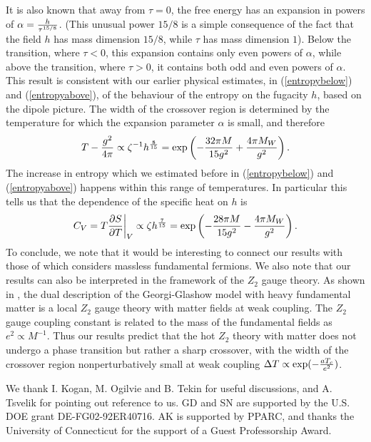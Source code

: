 \documentclass[a4paper,aps,prd,superscriptaddress,showpacs,showkeys]{revtex4}
\begin{document}
It is also known \cite{zamolodchikov} that away from $\tau=0$,
the free energy has an expansion in powers of
$\alpha={h\over\tau^{15/8}}$.
(This unusual power $15/8$ is a simple consequence of the fact that the
field $h$ has mass dimension $15/8$, while $\tau$ has mass dimension
$1$). Below the transition, where
$\tau<0$, this expansion contains only even powers of
$\alpha$,  while above the transition, where $\tau>0$, it contains both
odd and even powers of $\alpha$. This result is consistent with our
earlier physical estimates, in (\ref{entropybelow}) and
(\ref{entropyabove}), of the behaviour of the entropy on the fugacity
$h$, based on the dipole picture. The width of the crossover region is
determined by the temperature for which the expansion parameter $\alpha$
is small, and therefore
\begin{eqnarray}
T-{g^2\over 4\pi}\propto\zeta^{-1} h^{8\over 15}=
\exp\left(-{32\pi M\over 15 g^2}+{4\pi M_W\over g^2}\right) .
\end{eqnarray}
The increase in entropy which we estimated before in (\ref{entropybelow})
and (\ref{entropyabove}) happens within this range of temperatures. In
particular this tells us that the dependence of the specific heat on $h$
is
\begin{eqnarray}C_V=T{\partial S\over\partial T}\bigg{|}_{V}\propto
\zeta h^{7\over
15}=
\exp\left(-{28\pi M\over 15 g^2}-{4\pi M_W\over g^2}\right) .
\end{eqnarray}To conclude, we note that it would be interesting to
connect our
results with those of \cite{Agasian:2001an} which considers massless
fundamental fermions. We also note that our results can also be
interpreted
in the framework of the $Z_2$ gauge theory. As shown  in \cite{fosco},
the
dual description of the Georgi-Glashow model with heavy fundamental
matter
is a local $Z_2$ gauge theory with matter fields  at weak coupling. The
$Z_2$ gauge  coupling constant  is related to the mass of the fundamental
fields as $e^2\propto M^{-1}$. Thus our results predict that the hot
$Z_2$
theory with matter does not undergo a phase transition but rather a sharp
crossover, with the width of the crossover region nonperturbatively small
at weak coupling
$\Delta T\propto\exp(-{aT_c\over e^2})$.

\begin{acknowledgments}
We thank I. Kogan, M. Ogilvie and B. Tekin for useful discussions,
and A. Tsvelik for pointing out reference \cite{zamolodchikov} to us.
GD and SN are supported  by the U.S. DOE grant DE-FG02-92ER40716.
AK is supported by PPARC, and thanks the University of Connecticut for
the
support of a Guest Professorship Award.
\end{acknowledgments}
\end{document}
